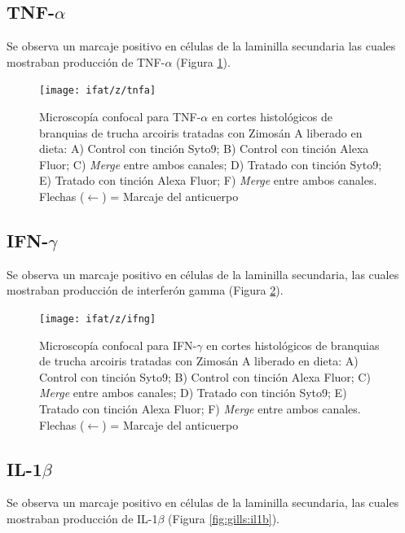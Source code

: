 \documentclass[12pt,letterpaper,oneside]{scrbook}
\begin{document}
\subsection{TNF-$\alpha$}

Se observa un marcaje positivo en células de la laminilla secundaria las
cuales mostraban producción de TNF-\(\alpha\) (Figura
\ref{fig:gills:tnfa}).

\begin{figure}[h!]
    \centering
    \texttt{[image: ifat/z/tnfa]}
    \caption[Microscopía Confocal para TNF-$\alpha$]{Microscopía confocal para TNF-$\alpha$ en cortes histológicos de branquias de trucha arcoiris tratadas con Zimosán A liberado en dieta: A) Control con tinción Syto9; B) Control con tinción Alexa Fluor; C) \emph{Merge} entre ambos canales; D) Tratado con tinción Syto9; E) Tratado con tinción Alexa Fluor; F) \emph{Merge} entre ambos canales. Flechas ($\leftarrow$) = Marcaje del anticuerpo}
    \label {fig:gills:tnfa}
\end{figure}

\subsection{IFN-$\gamma$}

Se observa un marcaje positivo en células de la laminilla secundaria,
las cuales mostraban producción de interferón gamma (Figura
\ref{fig:gills:ifng}).

\begin{figure}[h!]
    \centering
    \texttt{[image: ifat/z/ifng]}
    \caption[Microscopía Confocal para IFN-$\gamma$]{Microscopía confocal para IFN-$\gamma$ en cortes histológicos de branquias de trucha arcoiris tratadas con Zimosán A liberado en dieta:  A) Control con tinción Syto9; B) Control con tinción Alexa Fluor; C) \emph{Merge} entre ambos canales; D) Tratado con tinción Syto9; E) Tratado con tinción Alexa Fluor; F) \emph{Merge} entre ambos canales. Flechas ($\leftarrow$) = Marcaje del anticuerpo}
    \label {fig:gills:ifng}
\end{figure}

\subsection{IL-1$\beta$}

Se observa un marcaje positivo en células de la laminilla secundaria,
las cuales mostraban producción de IL-1\(\beta\) (Figura
\ref{fig:gills:il1b}).
\end{document}
